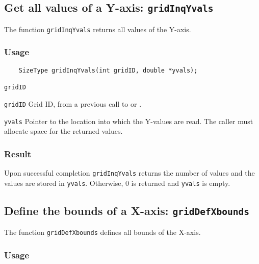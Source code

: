 \subsection{Get all values of a Y-axis: \texttt{gridInqYvals}}
\label{gridInqYvals}

The function {\texttt{gridInqYvals}} returns all values of the Y-axis.

\subsubsection*{Usage}

\begin{verbatim}
    SizeType gridInqYvals(int gridID, double *yvals);
\end{verbatim}

\hspace*{4mm}\begin{minipage}[]{15cm}
\begin{deflist}{\texttt{gridID}\ }
\item[\texttt{gridID}]
Grid ID, from a previous call to {} or {}.
\item[\texttt{yvals}]
Pointer to the location into which the Y-values are read.
                    The caller must allocate space for the returned values.

\end{deflist}
\end{minipage}

\subsubsection*{Result}

Upon successful completion {\texttt{gridInqYvals}} returns the number of values and
the values are stored in {\texttt{yvals}}.
Otherwise, 0 is returned and {\texttt{yvals}} is empty.



\subsection{Define the bounds of a X-axis: \texttt{gridDefXbounds}}
\label{gridDefXbounds}

The function {\texttt{gridDefXbounds}} defines all bounds of the X-axis.

\subsubsection*{Usage}

